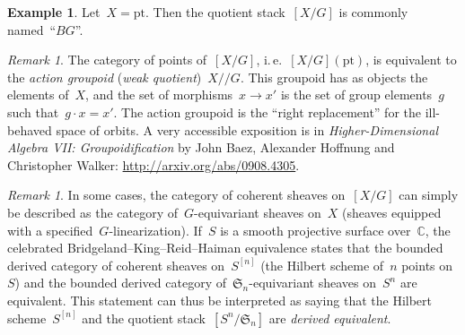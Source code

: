 \documentclass[a4paper,english,12pt]{scrartcl}
\theoremstyle{definition}
\newtheorem{ex}[defn]{Example}
\theoremstyle{plain}
\theoremstyle{remark}
\newtheorem{rem}[defn]{Remark}
\newcommand{\CC}{\mathbb{C}}
\newcommand{\pt}{\mathrm{pt}}
\begin{document}
\begin{ex}Let~$X = \pt$. Then the quotient stack~$[X/G]$ is commonly
named~``$BG$''.\end{ex}

\begin{rem}The category of points of~$[X/G]$, i.\,e.\@~$[X/G](\pt)$,
is equivalent to the \emph{action groupoid} (\emph{weak quotient})~$X/\!/G$.
This groupoid has as objects the elements of~$X$, and the set of morphisms~$x
\to x'$ is the set of group elements~$g$ such that~$g \cdot x = x'$.
The action groupoid is the ``right replacement'' for the ill-behaved space of
orbits. A very accessible exposition is in \emph{Higher-Dimensional Algebra
VII: Groupoidification} by John Baez, Alexander Hoffnung and Christopher
Walker: \url{http://arxiv.org/abs/0908.4305}.
\end{rem}

\begin{rem}In some cases, the category of coherent sheaves
on~$[X/G]$ can simply be described as the category of~$G$-equivariant sheaves
on~$X$ (sheaves equipped with a specified~$G$-linearization). If~$S$ is a
smooth projective surface over~$\CC$, the celebrated
Bridgeland--King--Reid--Haiman equivalence states that the bounded derived category
of coherent sheaves on~$S^{[n]}$ (the Hilbert scheme of~$n$ points on~$S$) and
the bounded derived category of~$\mathfrak{S}_n$-equivariant sheaves on~$S^n$
are equivalent. This statement can thus be interpreted as saying that the
Hilbert scheme~$S^{[n]}$ and the quotient stack~$[S^n/\mathfrak{S}_n]$ are
\emph{derived equivalent}.
\end{rem}
\end{document}
